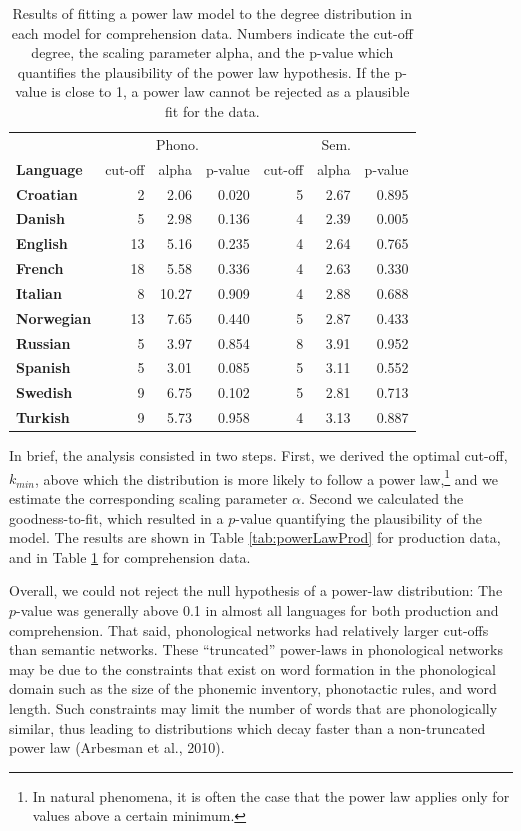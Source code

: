 \documentclass[english,floatsintext,man]{apa6}
\theoremstyle{definition}
\theoremstyle{definition}
\theoremstyle{definition}
\theoremstyle{remark}
\begin{document}
\begin{table}

\caption{\label{tab:powerLawComp}Results of fitting a power law model to the degree distribution in each model for comprehension data. Numbers indicate the cut-off degree, the scaling parameter alpha, and the p-value which quantifies the plausibility of the power law hypothesis. If the p-value is close to 1, a power law cannot be rejected as a plausible fit for the data.}
\centering
\begin{tabular}[t]{>{\bfseries}lrrrrrr}
\toprule
\multicolumn{1}{c}{} & \multicolumn{3}{c}{Phono.} & \multicolumn{3}{c}{Sem.} \\
\cmidrule(l{2pt}r{2pt}){2-4} \cmidrule(l{2pt}r{2pt}){5-7}
Language & cut-off & alpha & p-value & cut-off & alpha & p-value\\
\midrule
Croatian & 2 & 2.06 & 0.020 & 5 & 2.67 & 0.895\\
Danish & 5 & 2.98 & 0.136 & 4 & 2.39 & 0.005\\
English & 13 & 5.16 & 0.235 & 4 & 2.64 & 0.765\\
French & 18 & 5.58 & 0.336 & 4 & 2.63 & 0.330\\
Italian & 8 & 10.27 & 0.909 & 4 & 2.88 & 0.688\\
Norwegian & 13 & 7.65 & 0.440 & 5 & 2.87 & 0.433\\
Russian & 5 & 3.97 & 0.854 & 8 & 3.91 & 0.952\\
Spanish & 5 & 3.01 & 0.085 & 5 & 3.11 & 0.552\\
Swedish & 9 & 6.75 & 0.102 & 5 & 2.81 & 0.713\\
Turkish & 9 & 5.73 & 0.958 & 4 & 3.13 & 0.887\\
\bottomrule
\end{tabular}
\end{table}

In brief, the analysis consisted in two steps. First, we derived the
optimal cut-off, \(k_{min}\), above which the distribution is more
likely to follow a power
law,\footnote{In natural phenomena, it is often the case that the power law applies only for values above a certain minimum.}
and we estimate the corresponding scaling parameter \(\alpha\). Second
we calculated the goodness-to-fit, which resulted in a \(p\)-value
quantifying the plausibility of the model. The results are shown in
Table \ref{tab:powerLawProd} for production data, and in Table
\ref{tab:powerLawComp} for comprehension data.

Overall, we could not reject the null hypothesis of a power-law
distribution: The \(p\)-value was generally above 0.1 in almost all
languages for both production and comprehension. That said, phonological
networks had relatively larger cut-offs than semantic networks. These
\enquote{truncated} power-laws in phonological networks may be due to
the constraints that exist on word formation in the phonological domain
such as the size of the phonemic inventory, phonotactic rules, and word
length. Such constraints may limit the number of words that are
phonologically similar, thus leading to distributions which decay faster
than a non-truncated power law (Arbesman et al., 2010).
\end{document}
